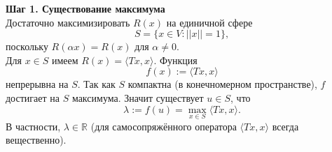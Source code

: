\documentclass[14pt]{extreport}
\begin{document}
    \begin{prbox}
        \textbf{Шаг 1. Существование максимума}\\
        Достаточно максимизировать $R(x)$ на единичной сфере
        \[
        S = \{ x \in V: ||x|| = 1 \},
        \]
        поскольку $R(\alpha x) = R(x)$ для $\alpha \neq 0$.\\
        Для $x \in S$ имеем $R(x) = \langle Tx,x \rangle$. Функция
        \[
        f(x) := \langle Tx,x \rangle
        \]
        непрерывна на $S$. Так как $S$ компактна (в конечномерном пространстве), $f$ достигает на $S$ максимума. Значит существует $u \in S$, что
        \[
        \lambda := f(u) = \max_{x \in S} \langle Tx,x \rangle.
        \]
        В частности, $\lambda \in \mathbb{R}$ (для самосопряжённого оператора $\langle Tx,x \rangle$ всегда вещественно).


\end{prbox}
\end{document}
